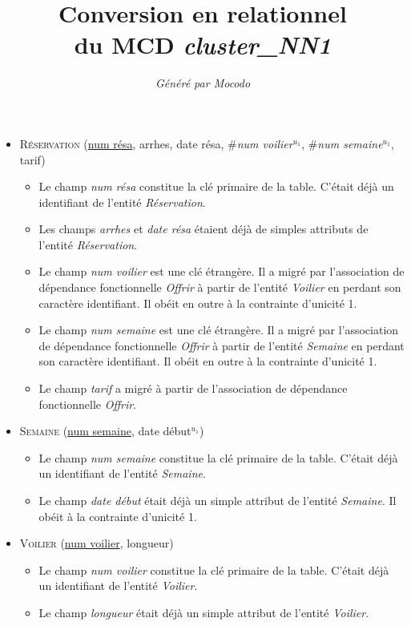 \documentclass[a4paper]{article}
\title{Conversion en relationnel\\du MCD \emph{cluster_NN1}}
\author{\emph{Généré par Mocodo}}
\newcommand{\relat}[1]{\textsc{#1}}
\newcommand{\attr}[1]{#1}
\newcommand{\prim}[1]{\uline{#1}}
\newcommand{\foreign}[1]{\#\textsl{#1}}
\begin{document}
\maketitle

\begin{itemize}
  \item \relat{Réservation} (\prim{num résa}, \attr{arrhes}, \attr{date résa}, \foreign{num voilier}$^{u_1}$, \foreign{num semaine}$^{u_1}$, \attr{tarif})
  \begin{itemize}
    \item Le champ \emph{num résa} constitue la clé primaire de la table. C'était déjà un identifiant de l'entité \emph{Réservation}.
    \item Les champs \emph{arrhes} et \emph{date résa} étaient déjà de simples attributs de l'entité \emph{Réservation}.
    \item Le champ \emph{num voilier} est une clé étrangère. Il a migré par l'association de dépendance fonctionnelle \emph{Offrir} à partir de l'entité \emph{Voilier} en perdant son caractère identifiant. Il obéit en outre à la contrainte d'unicité 1.
    \item Le champ \emph{num semaine} est une clé étrangère. Il a migré par l'association de dépendance fonctionnelle \emph{Offrir} à partir de l'entité \emph{Semaine} en perdant son caractère identifiant. Il obéit en outre à la contrainte d'unicité 1.
    \item Le champ \emph{tarif} a migré à partir de l'association de dépendance fonctionnelle \emph{Offrir}.
  \end{itemize}

  \item \relat{Semaine} (\prim{num semaine}, \attr{date début}$^{u_1}$)
  \begin{itemize}
    \item Le champ \emph{num semaine} constitue la clé primaire de la table. C'était déjà un identifiant de l'entité \emph{Semaine}.
    \item Le champ \emph{date début} était déjà un simple attribut de l'entité \emph{Semaine}. Il obéit à la contrainte d'unicité 1.
  \end{itemize}

  \item \relat{Voilier} (\prim{num voilier}, \attr{longueur})
  \begin{itemize}
    \item Le champ \emph{num voilier} constitue la clé primaire de la table. C'était déjà un identifiant de l'entité \emph{Voilier}.
    \item Le champ \emph{longueur} était déjà un simple attribut de l'entité \emph{Voilier}.
  \end{itemize}

\end{itemize}
\end{document}
